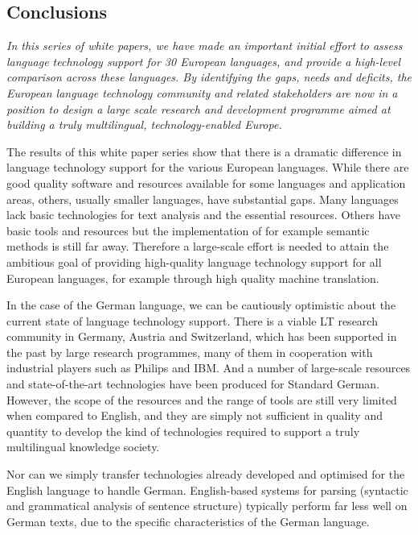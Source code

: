 \documentclass[]{../../metanetpaper}
\begin{document}
\begin{multicols}{2}
\subsection{Conclusions}

\emph{In this series of white papers, we have made an important initial effort to assess language technology support for 30 European languages, and provide a high-level comparison across these languages. By identifying the gaps, needs and deficits, the European language technology community and related stakeholders are now in a position to design a large scale research and development programme aimed at building a truly multilingual, technology-enabled Europe.}

The results of this white paper series show that there is a dramatic difference in language technology support for the various European languages. While there are good quality software and resources available for some languages and application areas, others, usually smaller languages, have substantial gaps. Many languages lack basic technologies for text analysis and the essential resources. Others have basic tools and resources but the implementation of for example semantic methods is still far away. Therefore a large-scale effort is needed to attain the ambitious goal of providing high-quality language technology support for all European languages, for example through high quality machine translation. 

In the case of the German language, we can be cautiously optimistic about the current state of language technology support. There is a viable LT research community in Germany, Austria and Switzerland, which has been supported in the past by large research programmes, many of them in cooperation with industrial players such as Philips and IBM. And a number of large-scale resources and state-of-the-art technologies have been produced for Standard German. However, the scope of the resources and the range of tools are still very limited when compared to English, and they are simply not sufficient in quality and quantity to develop the kind of technologies required to support a truly multilingual knowledge society.

Nor can we simply transfer technologies already developed and optimised for the English language to handle German. English-based systems for parsing (syntactic and grammatical analysis of sentence structure) typically perform far less well on German texts, due to the specific characteristics of the German language.


\end{multicols}
\end{document}

